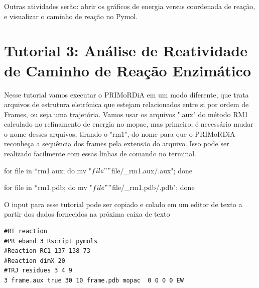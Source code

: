 \documentclass[a4paper,11pt]{refart}
\begin{document}
	Outras atividades serão: abrir os gráficos de energia versus coordenada de reação, e visualizar o caminho de reação no Pymol. 
	
	\section{Tutorial 3: Análise de Reatividade de Caminho de Reação Enzimático} 
	
	Nesse tutorial vamos executar o PRIMoRDiA em um modo diferente, que trata arquivos de estrutura eletrônica que estejam relacionados entre si por ordem de Frames, ou seja uma trajetória. Vamos usar os arquivos ".aux" do método RM1 calculado no refinamento de energia no mopac, mas primeiro, é necessário mudar o nome desses arquivos, tirando o "rm1", do nome para que o PRIMoRDiA reconheça a sequência dos frames pela extensão do arquivo. Isso pode ser realizado facilmente com essas linhas de comando no terminal.
	
		\hspace*{-\leftmarginwidth}
	\begin{minipage}{\fullwidth}
		\begin{commandshell}for file in *rm1.aux; 
			do 
			mv "$file" "${file/_rm1.aux/.aux}";
			done	\end{commandshell}
	\end{minipage}
	
	\hspace*{-\leftmarginwidth}
	\begin{minipage}{\fullwidth}
		\begin{commandshell}for file in *rm1.pdb; 
			do 
			mv "$file" "${file/_rm1.pdb/.pdb}";
			done\end{commandshell}
	\end{minipage}

	 O input para esse tutorial pode ser copiado e colado em um editor de texto a partir dos dados fornecidos na próxima caixa de texto
	 
	 	 \hspace*{-\leftmarginwidth}
	 \begin{minipage}{\fullwidth}
	 	\begin{lstlisting}[caption={Input editado para execução do tutorial 3},label={tut402}]
#RT reaction 
#PR eband 3 Rscript pymols
#Reaction RC1 137 138 73
#Reaction dimX 20
#TRJ residues 3 4 9
3 frame.aux true 30 10 frame.pdb mopac  0 0 0 0 EW
	 	\end{lstlisting}
	 \end{minipage}
	 
\end{document}
